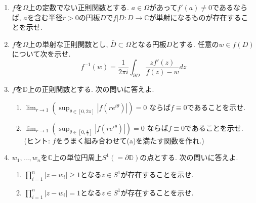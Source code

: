 \documentclass[dvipdfmx,a4paper,11pt]{article}
\newcommand{\C}{\mathbb{C}}
\newcommand{\D}{\mathbb{D}}
\theoremstyle{definition}
\begin{document}
\begin{enumerate}[label=\textbf{問}6.\arabic*]
   
   \item $f$を$\Omega$上の定数でない正則関数とする. $a \in \Omega$があって$f' (a) \neq 0$であるならば, 
   $a$を含む半径$r > 0$の円板$D$で$f|D : D \rightarrow \C$が単射になるものが存在することを示せ.
    
   \item $f$を$\Omega$上の単射な正則関数とし, $\bar{D} \subset \Omega$となる円板$D$とする. 
   任意の$w \in f(D)$について次を示せ. 
   $$
   f^{-1}(w) = \frac{1}{2 \pi i} \int_{\partial D} \frac{zf'(z)}{f(z) - w} dz
   $$
   
   \item $f$を$\D$上の正則関数とする. 次の問いに答えよ.
     \begin{enumerate}
\setlength{\parskip}{0cm} 
  \setlength{\itemsep}{0cm} 
  \item 
  $
  \lim_{r \to 1} 
  \left(\sup_{ \theta \in [0 , 2 \pi]} |f(r e^{i \theta})| \right) =0
  $
 ならば$f \equiv 0$であることを示せ.
\item     $
  \lim_{r \to 1} 
  \left(\sup_{ \theta \in [0 , \frac{\pi}{2}] } |f(r e^{i \theta})| \right) =0
  $
 ならば$f \equiv 0$であることを示せ. (ヒント: $f$をうまく組み合わせて(a)を満たす関数を作れ.)
        \end{enumerate}  
\item $w_1, \ldots, w_n$を$\C$上の単位円周上$S^1(=\partial \D)$の点とする. 
次の問いに答えよ.
  \begin{enumerate}
\setlength{\parskip}{0cm} 
  \setlength{\itemsep}{0cm} 
\item $\prod_{i=1}^{n} |z - w_i| \ge 1$となる$z \in S^1$が存在することを示せ. 
\item $\prod_{i=1}^{n} |z - w_i|=1$となる$z \in S^1$が存在することを示せ. 
     \end{enumerate}  
     

\end{enumerate}
\end{document}
